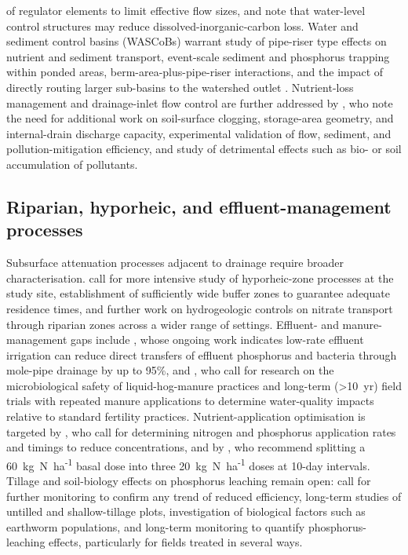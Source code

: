 \documentclass[11pt]{article}
\begin{document}
of regulator elements to limit effective flow sizes, and \textcite{Schilling2023} note that water-level control structures may reduce dissolved-inorganic-carbon loss. Water and sediment control basins (WASCoBs) warrant study of pipe-riser type effects on nutrient and sediment transport, event-scale sediment and phosphorus trapping within ponded areas, berm-area-plus-pipe-riser interactions, and the impact of directly routing larger sub-basins to the watershed outlet \parencite{Gupta2019}. Nutrient-loss management and drainage-inlet flow control are further addressed by \textcite{Nédélec2010}, who note the need for additional work on soil-surface clogging, storage-area geometry, and internal-drain discharge capacity, experimental validation of flow, sediment, and pollution-mitigation efficiency, and study of detrimental effects such as bio- or soil accumulation of pollutants.

\subsection{Riparian, hyporheic, and effluent-management processes}
Subsurface attenuation processes adjacent to drainage require broader characterisation. \textcite{Puckett2005} call for more intensive study of hyporheic-zone processes at the study site, establishment of sufficiently wide buffer zones to guarantee adequate residence times, and further work on hydrogeologic controls on nitrate transport through riparian zones across a wider range of settings. Effluent- and manure-management gaps include \textcite{Monaghan2007}, whose ongoing work indicates low-rate effluent irrigation can reduce direct transfers of effluent phosphorus and bacteria through mole-pipe drainage by up to 95\%, and \textcite{Gordon2005}, who call for research on the microbiological safety of liquid-hog-manure practices and long-term (>10~yr) field trials with repeated manure applications to determine water-quality impacts relative to standard fertility practices. Nutrient-application optimisation is targeted by \textcite{Farahani2020}, who call for determining nitrogen and phosphorus application rates and timings to reduce concentrations, and by \textcite{Singh2002}, who recommend splitting a 60~kg~N~ha\textsuperscript{-1} basal dose into three 20~kg~N~ha\textsuperscript{-1} doses at 10-day intervals. Tillage and soil-biology effects on phosphorus leaching remain open: \textcite{Ulén2018} call for further monitoring to confirm any trend of reduced efficiency, long-term studies of untilled and shallow-tillage plots, investigation of biological factors such as earthworm populations, and long-term monitoring to quantify phosphorus-leaching effects, particularly for fields treated in several ways.
\end{document}
